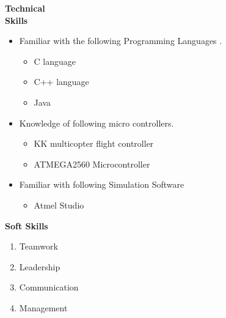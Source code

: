\documentclass{article}
\begin{document}
	\begin{flushleft}
	   	\vspace{1.15in}
	   	\textbf{Technical  \\ Skills}
	   	\begin{itemize}
	   		\vspace{-0.45in}
	   		\addtolength{\itemindent}{1.359in}
	   		\item  Familiar with the following Programming Languages .
	   		{\begin{itemize}
	   				\addtolength{\itemindent}{1.359in}
	   				\item C language
	   				\item C++ language
	   				\item Java 	
	   			\end{itemize}
	   		}  
	   		\item Knowledge of following micro controllers.
	   		{\begin{itemize}
	   				\addtolength{\itemindent}{1.359in}
	   				\item KK multicopter flight controller
	   				\item ATMEGA2560 Microcontroller	
	   			\end{itemize}
	   		}  
	   		
	   		\item Familiar with following Simulation Software
	   		{\begin{itemize}
	   				\addtolength{\itemindent}{1.359in}
	   				\item Atmel Studio 	
	   			\end{itemize}
	   		} 
	   	\end{itemize}
	   \end{flushleft}
	   
	   \begin{flushleft} 
	     	 		
	     	 		\vspace{0.4in}
	     	 		\textbf{Soft Skills}
	     	 		\begin{enumerate}
	     	 			\vspace{-0.30in}
	     	 			\addtolength{\itemindent}{1.359in}
						\item Teamwork 	     	 			
	     	 			\item Leadership
	     	 			\item Communication  
	     	 			\item Management
	     	 		\end{enumerate}
	     	 	\end{flushleft}
	     	 	
\end{document}
